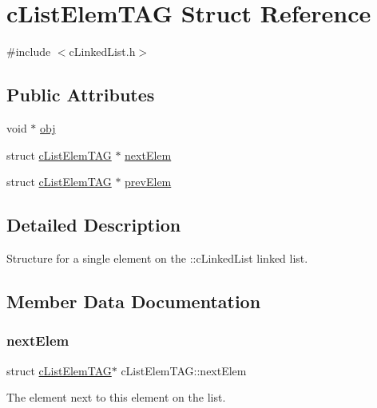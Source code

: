 \hypertarget{structc_list_elem_t_a_g}{}\section{c\+List\+Elem\+T\+AG Struct Reference}
\label{structc_list_elem_t_a_g}


{\ttfamily \#include $<$c\+Linked\+List.\+h$>$}

\subsection*{Public Attributes}
\begin{DoxyCompactItemize}
\item 
void $\ast$ \mbox{\hyperlink{structc_list_elem_t_a_g_a442ba5668d8285b67e9486d52a8f95a2}{obj}}
\item 
struct \mbox{\hyperlink{structc_list_elem_t_a_g}{c\+List\+Elem\+T\+AG}} $\ast$ \mbox{\hyperlink{structc_list_elem_t_a_g_a1cacd74d17bcd3c27fcd74c544eeecb4}{next\+Elem}}
\item 
struct \mbox{\hyperlink{structc_list_elem_t_a_g}{c\+List\+Elem\+T\+AG}} $\ast$ \mbox{\hyperlink{structc_list_elem_t_a_g_a563abebeaccea17de149b4baf1803bc2}{prev\+Elem}}
\end{DoxyCompactItemize}


\subsection{Detailed Description}
Structure for a single element on the \+::c\+Linked\+List linked list. 

\subsection{Member Data Documentation}
\mbox{\label{structc_list_elem_t_a_g_a1cacd74d17bcd3c27fcd74c544eeecb4}} 
\subsubsection{\texorpdfstring{next\+Elem}{nextElem}}
{\footnotesize\ttfamily struct \mbox{\hyperlink{structc_list_elem_t_a_g}{c\+List\+Elem\+T\+AG}}$\ast$ c\+List\+Elem\+T\+A\+G\+::next\+Elem}

The element next to this element on the list. \mbox{\label{structc_list_elem_t_a_g_a442ba5668d8285b67e9486d52a8f95a2}} 
